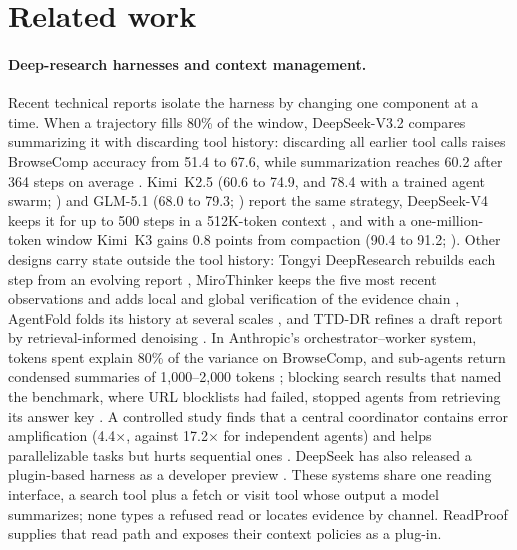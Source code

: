 \documentclass[11pt]{article}
\begin{document}
\section{Related work}\label{sec:related}

\paragraph{Deep-research harnesses and context management.}
Recent technical reports isolate the harness by changing one component at a time. When a trajectory fills
80\% of the window, DeepSeek-V3.2 compares summarizing it with discarding tool history: discarding all
earlier tool calls raises BrowseComp accuracy from 51.4 to 67.6, while summarization reaches 60.2 after 364
steps on average \citep{deepseek2025v32}. Kimi~K2.5 (60.6 to 74.9, and 78.4 with a trained agent swarm;
\citealp{kimi2026k25}) and GLM-5.1 (68.0 to 79.3; \citealp{zai2026glm51}) report the same strategy,
DeepSeek-V4 keeps it for up to 500 steps in a 512K-token context \citep{deepseek2026v4}, and with a
one-million-token window Kimi~K3 gains 0.8 points from compaction (90.4 to 91.2; \citealp{moonshot2026kimik3}).
Other designs carry state outside the tool history: Tongyi DeepResearch rebuilds each step from an evolving
report \citep{tongyi2025deepresearch}, MiroThinker keeps the five most recent observations and adds local and
global verification of the evidence chain \citep{mirothinker2026h1}, AgentFold folds its history at several
scales \citep{ye2025agentfold}, and TTD-DR refines a draft report by retrieval-informed denoising
\citep{han2025ttddr}. In Anthropic's orchestrator--worker system, tokens spent explain 80\% of the variance on
BrowseComp, and sub-agents return condensed summaries of 1{,}000--2{,}000 tokens
\citep{anthropic2025multiagent,anthropic2025context}; blocking search results that named the benchmark, where
URL blocklists had failed, stopped agents from retrieving its answer key \citep{anthropic2026evalawareness}.
A controlled study finds that a central coordinator contains error amplification (4.4$\times$, against
17.2$\times$ for independent agents) and helps parallelizable tasks but hurts sequential ones
\citep{kim2025scaling}. DeepSeek has also released a plugin-based harness as a developer preview
\citep{deepseek2026harness,shi2026composability}. These systems share one reading interface, a search tool
plus a fetch or visit tool whose output a model summarizes; none types a refused read or locates evidence by
channel. ReadProof supplies that read path and exposes their context policies as a plug-in.
\end{document}
